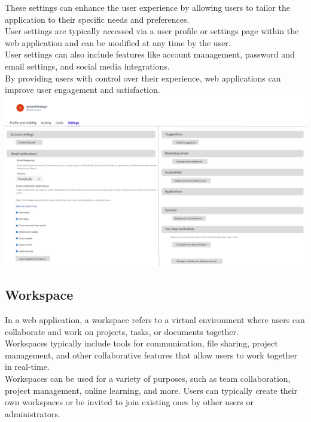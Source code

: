 These settings can enhance the user experience by allowing users to tailor the application to their specific needs and preferences.\\

User settings are typically accessed via a user profile or settings page within the web application and can be modified at any time by the user.\\

User settings can also include features like account management, password and email settings, and social media integrations.\\

By providing users with control over their experience, web applications can improve user engagement and satisfaction.\\
\includegraphics[width=\columnwidth]{WA-workflix-HW1/images/UserSetting.jpg}



\subsection{Workspace}

In a web application, a workspace refers to a virtual environment where users can collaborate and work on projects, tasks, or documents together.\\

Workspaces typically include tools for communication, file sharing, project management, and other collaborative features that allow users to work together in real-time.\\

Workspaces can be used for a variety of purposes, such as team collaboration, project management, online learning, and more. Users can typically create their own workspaces or be invited to join existing ones by other users or administrators.\\


